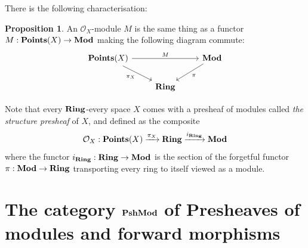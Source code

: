 \documentclass[8pt]{article}
\theoremstyle{definition}
\theoremstyle{definition}
\theoremstyle{definition}
\theoremstyle{definition}
\theoremstyle{definition}
\theoremstyle{definition}
\theoremstyle{definition}
\newtheorem{prop}{Proposition}[section]
\theoremstyle{definition}
\theoremstyle{definition}
\theoremstyle{definition}
\theoremstyle{definition}
\theoremstyle{definition}
\theoremstyle{definition}
\theoremstyle{definition}
\theoremstyle{question}
\begin{document}
There is the following characterisation:
\begin{prop}
  An $\mathcal{O}_X$-module $M$ is the same thing as a functor $M : {\bf Points}(X) \to {\bf Mod}$ making the following diagram commute:
  \[
  \begin{tikzcd}
    {\bf Points}(X) \ar[dr, "\pi_X"'] \ar[rr, "M"] && {\bf Mod} \ar[dl, "\pi" ]\\
    & {\bf Ring}
  \end{tikzcd}
  \]
\end{prop}

Note that every ${\bf Ring}$-every space $X$ comes with a presheaf of modules called \emph{the structure presheaf} of $X$, and defined 
as the composite
\[
\mathcal{O}_X : {\bf Points}(X) \xrightarrow{\pi_X} {\bf Ring} \xrightarrow{i_{\bf Ring}} {\bf Mod}
\]
where the functor $i_{\bf Ring} : {\bf Ring} \to {\bf Mod}$ is the section of the forgetful functor $\pi : {\bf Mod} \to {\bf Ring}$ transporting
every ring to itself viewed as a module.

\section{The category ${\bf PshMod}$ of Presheaves of modules and forward morphisms}
\end{document}
